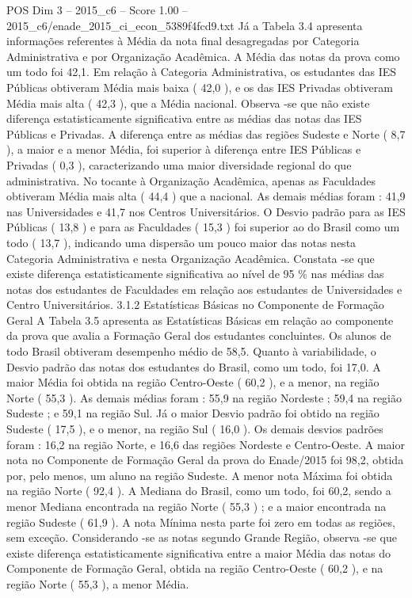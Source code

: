 \begin{textsample}{POS Dim 3 – 2015\_c6 – Score 1.00 – 2015\_c6/enade\_2015\_ci\_econ\_5389f4fcd9.txt}
Já a Tabela 3.4 apresenta informações referentes à Média da nota final desagregadas por Categoria Administrativa e por Organização Acadêmica.
A Média das notas da prova como um todo foi 42,1.
Em relação à Categoria Administrativa, os estudantes das IES Públicas obtiveram Média mais baixa ( 42,0 ), e os das IES Privadas obtiveram Média mais alta ( 42,3 ), que a Média nacional.
Observa -se que não existe diferença estatisticamente significativa entre as médias das notas das IES Públicas e Privadas.
A diferença entre as médias das regiões Sudeste e Norte ( 8,7 ), a maior e a menor Média, foi superior à diferença entre IES Públicas e Privadas ( 0,3 ), caracterizando uma maior diversidade regional do que administrativa.
No tocante à Organização Acadêmica, apenas as Faculdades obtiveram Média mais alta ( 44,4 ) que a nacional.
As demais médias foram : 41,9 nas Universidades e 41,7 nos Centros Universitários.
O Desvio padrão para as IES Públicas ( 13,8 ) e para as Faculdades ( 15,3 ) foi superior ao do Brasil como um todo ( 13,7 ), indicando uma dispersão um pouco maior das notas nesta Categoria Administrativa e nesta Organização Acadêmica.
Constata -se que existe diferença estatisticamente significativa ao nível de 95 \% nas médias das notas dos estudantes de Faculdades em relação aos estudantes de Universidades e Centro Universitários. 3.1.2 Estatísticas Básicas no Componente de Formação Geral A Tabela 3.5 apresenta as Estatísticas Básicas em relação ao componente da prova que avalia a Formação Geral dos estudantes concluintes.
Os alunos de todo Brasil obtiveram desempenho médio de 58,5.
Quanto à variabilidade, o Desvio padrão das notas dos estudantes do Brasil, como um todo, foi 17,0.
A maior Média foi obtida na região Centro-Oeste ( 60,2 ), e a menor, na região Norte ( 55,3 ).
As demais médias foram : 55,9 na região Nordeste ; 59,4 na região Sudeste ; e 59,1 na região Sul.
Já o maior Desvio padrão foi obtido na região Sudeste ( 17,5 ), e o menor, na região Sul ( 16,0 ).
Os demais desvios padrões foram : 16,2 na região Norte, e 16,6 das regiões Nordeste e Centro-Oeste.
A maior nota no Componente de Formação Geral da prova do Enade/2015 foi 98,2, obtida por, pelo menos, um aluno na região Sudeste.
A menor nota Máxima foi obtida na região Norte ( 92,4 ).
A Mediana do Brasil, como um todo, foi 60,2, sendo a menor Mediana encontrada na região Norte ( 55,3 ) ; e a maior encontrada na região Sudeste ( 61,9 ).
A nota Mínima nesta parte foi zero em todas as regiões, sem exceção.
Considerando -se as notas segundo Grande Região, observa -se que existe diferença estatisticamente significativa entre a maior Média das notas do Componente de Formação Geral, obtida na região Centro-Oeste ( 60,2 ), e na região Norte ( 55,3 ), a menor Média.

\end{textsample}
